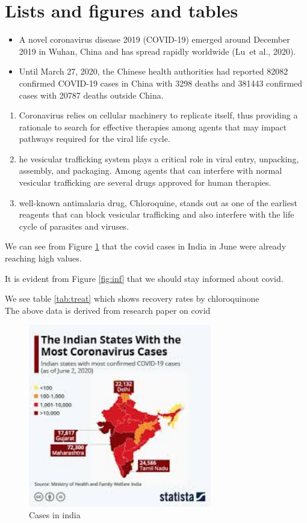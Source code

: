 \documentclass[10pt, a4paper]{article}
\begin{document}
\section{Lists and figures and tables}
	\begin{itemize}
		\item A novel coronavirus disease 2019 (COVID-19) emerged around December
		2019 in Wuhan, China and has spread rapidly worldwide (Lu~et al., 2020).
		\item Until March 27, 2020, the Chinese health authorities had reported 82082
		confirmed COVID-19 cases in China with 3298 deaths and 381443 confirmed cases with 20787 deaths outside China.
	\end{itemize}
	\begin{enumerate}
		\item Coronavirus relies on cellular machinery to replicate itself, thus providing
		a rationale to search for effective therapies among agents that may impact
		pathways required for the viral life cycle.
		\item he vesicular trafficking system plays a critical role in viral entry, unpacking,
		assembly, and packaging. Among agents that can interfere with normal
		vesicular trafficking are several drugs approved for human therapies.
		\item well-known antimalaria drug, Chloroquine, stands out as one of the earliest
		reagents that can block vesicular trafficking and also interfere with the life
		cycle of parasites and viruses.
	\end{enumerate} \par
We can see from Figure \ref{fig:case} that the covid cases in India in June were already reaching high values. \\ \par 
It is evident from Figure \ref{fig:inf} that we should stay informed about covid.  \\ \par
We see table \ref{tab:treat} which shows recovery rates by chloroquinone\\
The above data is derived from research paper on covid \cite{huang2020treating}
\newpage
\begin{figure}
	\includegraphics[width=8cm, height=8cm]{c19}
	\centering
	\caption{Cases in india}
	\label{fig:case}
\end{figure}
\end{document}
